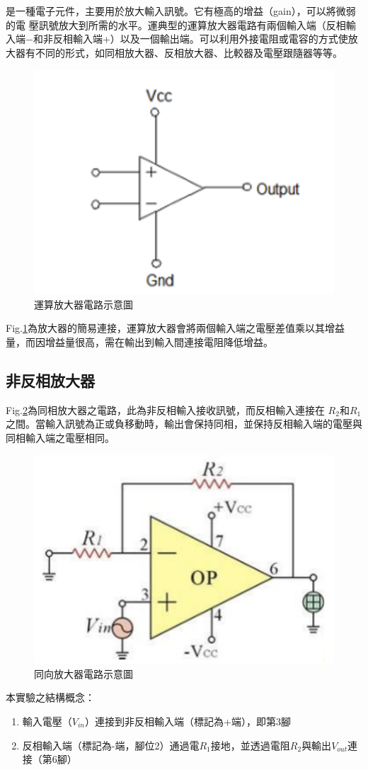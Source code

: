 \documentclass[12pt,a4paper]{article}
\begin{document}
\begin{CJK}{UTF8}{bkai}
是一種電子元件，主要用於放大輸入訊號。它有極高的增益（gain），可以將微弱的電 壓訊號放大到所需的水平。運典型的運算放大器電路有兩個輸入端（反相輸入端−和非反相輸入端+）以及一個輸出端。可以利用外接電阻或電容的方式使放大器有不同的形式，如同相放大器、反相放大器、比較器及電壓跟隨器等等。 

\begin{figure}[h]
    \centering
    \includegraphics[width=0.5\linewidth]{figures/opamp.png}
    \caption{運算放大器電路示意圖}
    \label{fig:opamp}
\end{figure}

Fig.\ref{fig:opamp}為放大器的簡易連接，運算放大器會將兩個輸入端之電壓差值乘以其增益量，而因增益量很高，需在輸出到輸入間連接電阻降低增益。 

\subsection{非反相放大器}
\hfill

Fig.\ref{fig:noninvert}為同相放大器之電路，此為非反相輸入接收訊號，而反相輸入連接在 $R_2$和$R_1$之間。當輸入訊號為正或負移動時，輸出會保持同相，並保持反相輸入端的電壓與同相輸入端之電壓相同。


\begin{figure}[h]
    \centering
    \includegraphics[width=0.4\linewidth]{figures/noninvert.png}
    \caption{同向放大器電路示意圖}
    \label{fig:noninvert}
\end{figure}

本實驗之結構概念：
\begin{enumerate}
    \item 輸入電壓（$V_{in}$）連接到非反相輸入端（標記為+端），即第3腳
    \item 反相輸入端（標記為-端，腳位2）通過電$R_1$接地，並透過電阻$R_2$與輸出$V_{out}$連接（第6腳）
\end{enumerate}


\end{CJK}
\end{document}
